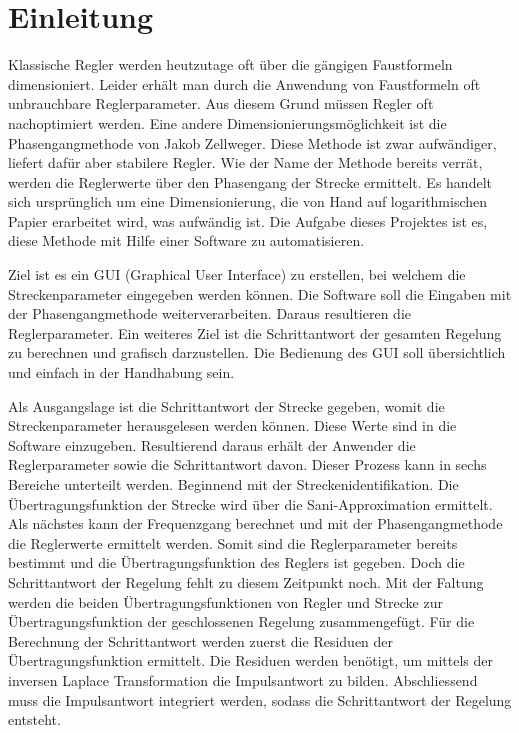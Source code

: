 \section{Einleitung}
Klassische Regler werden heutzutage oft über die gängigen Faustformeln dimensioniert. Leider erhält man durch die Anwendung von Faustformeln oft unbrauchbare Reglerparameter. Aus diesem Grund müssen Regler oft nachoptimiert werden. Eine andere Dimensionierungsmöglichkeit ist die Phasengangmethode von Jakob Zellweger. Diese Methode ist zwar aufwändiger, liefert dafür aber stabilere Regler. Wie der Name der Methode bereits verrät, werden die Reglerwerte über den Phasengang der Strecke ermittelt. Es handelt sich ursprünglich um eine Dimensionierung, die von Hand auf logarithmischen Papier erarbeitet wird, was aufwändig ist. Die Aufgabe dieses Projektes ist es, diese Methode mit Hilfe einer Software zu automatisieren.
 
Ziel ist es ein GUI (Graphical User Interface) zu erstellen, bei welchem die Streckenparameter eingegeben werden können. Die Software soll die Eingaben mit der Phasengangmethode weiterverarbeiten. Daraus resultieren die Reglerparameter. Ein weiteres Ziel ist die Schrittantwort der gesamten Regelung zu berechnen und grafisch darzustellen. Die Bedienung des GUI soll übersichtlich und einfach in der Handhabung sein.

Als Ausgangslage ist die Schrittantwort der Strecke gegeben, womit die Streckenparameter herausgelesen werden können. Diese Werte sind in die Software einzugeben. Resultierend daraus erhält der Anwender die Reglerparameter sowie die Schrittantwort davon. Dieser Prozess kann in sechs Bereiche unterteilt werden. Beginnend mit der Streckenidentifikation. Die Übertragungsfunktion der Strecke wird über die Sani-Approximation ermittelt. Als nächstes kann der Frequenzgang berechnet und mit der Phasengangmethode die Reglerwerte ermittelt werden. Somit sind die Reglerparameter bereits bestimmt und die Übertragungsfunktion des Reglers ist gegeben. Doch die Schrittantwort der Regelung fehlt zu diesem Zeitpunkt noch. Mit der Faltung werden die beiden Übertragungsfunktionen von Regler und Strecke zur Übertragungsfunktion der geschlossenen Regelung zusammengefügt. Für die Berechnung der Schrittantwort werden zuerst die Residuen der Übertragungsfunktion ermittelt. Die Residuen werden benötigt, um mittels der inversen Laplace Transformation die Impulsantwort zu bilden. Abschliessend muss die Impulsantwort integriert werden, sodass die Schrittantwort der Regelung entsteht.


